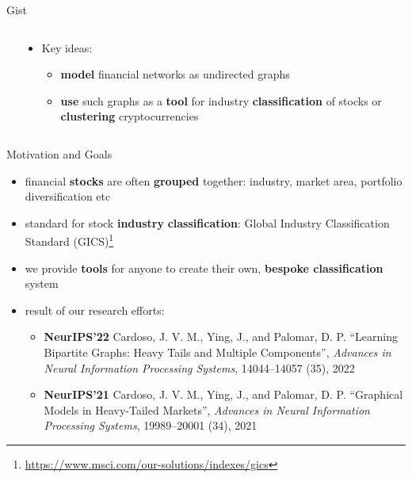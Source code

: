 \documentclass[aspectratio=169]{beamer}
\begin{document}
\begin{frame}{Gist}
\begin{minipage}[0.2\textheight]{\textwidth}
  \begin{columns}[T]
  \begin{column}{0.5\textwidth}
       \begin{center}
       \end{center}
  \end{column}
  \begin{column}{0.5\textwidth}
    \vspace{1.5cm}
    \pause
    \begin{itemize}
      \item Key ideas:
   \begin{itemize}
    \pause
   \item \textbf{model} financial networks as undirected graphs
   \pause
   \item \textbf{use} such graphs as a \textbf{tool} for industry \textbf{classification} of stocks or \textbf{clustering} cryptocurrencies
   \end{itemize}
  \end{itemize}
  \end{column}
  \end{columns}
  \end{minipage}
\end{frame}
%
\begin{frame}{Motivation and Goals}
  \vspace{1cm}
  \begin{itemize}
    \pause
    \item financial \textbf{stocks} are often \textbf{grouped} together: industry, market area, portfolio diversification etc
    \pause
    \item standard for stock \textbf{industry} \textbf{classification}: Global Industry Classification Standard (GICS)\footnote{\url{https://www.msci.com/our-solutions/indexes/gics}}
    \pause
    \item we provide \textbf{tools} for anyone to create their own, \textbf{bespoke classification} system 
    \pause
    \item result of our research efforts:
    \begin{itemize}
      \item \textbf{NeurIPS'22} Cardoso, J. V. M., Ying, J., and Palomar, D. P. ``Learning Bipartite Graphs: Heavy Tails and Multiple Components'',
      \textit{Advances in Neural Information Processing Systems}, 14044--14057 (35), 2022
      \item \textbf{NeurIPS'21} Cardoso, J. V. M., Ying, J., and Palomar, D. P. ``Graphical Models in Heavy-Tailed Markets'',
      \textit{Advances in Neural Information Processing Systems}, 19989--20001 (34), 2021 
    \end{itemize}
  \end{itemize}
\end{frame}
\end{document}
